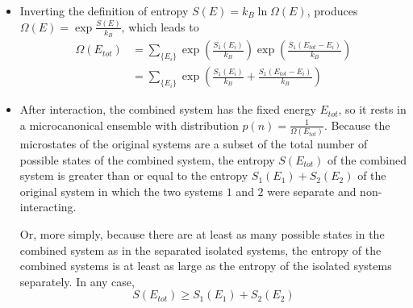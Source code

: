 \documentclass[11pt, a4paper]{article}
\begin{document}
\begin{itemize}
	\item Inverting the definition of entropy $ S(E) = k_{B}\ln \Omega(E) $, produces $ \Omega(E) = \exp \frac{S(E)}{k_{B}} $, which leads to 
	\begin{align*}
		\Omega(E_{tot}) &= \sum_{\{E_{i}\}} \exp(\frac{S_{1}(E_{i})}{k_{B}}) \exp(\frac{S_{1}(E_{tot} - E_{i})}{k_{B}}) \\
		& = \sum_{\{E_{i}\}} \exp(\frac{S_{1}(E_{i})}{k_{B}} + \frac{S_{1}(E_{tot} - E_{i})}{k_{B}})
	\end{align*}
	

	
	\item After interaction, the combined system has the fixed energy $ E_{tot} $, so it rests in a microcanonical ensemble with distribution $ p(n) = \frac{1}{\Omega(E_{tot})}$. Because the microstates of the original systems are a subset of the total number of possible states of the combined system, the entropy $ S(E_{tot}) $ of the combined system is greater than or equal to the entropy $ S_{1}(E_{1}) + S_{2}(E_{2}) $ of the original system in which the two systems $ 1 $ and $ 2 $ were separate and non-interacting.

	Or, more simply, because there are at least as many possible states in the combined system as in the separated isolated systems, the entropy of the combined systems is at least as large as the entropy of the isolated systems separately. In any case,
	\begin{equation*}
		S(E_{tot}) \geq S_{1}(E_{1}) + S_{2}(E_{2})
	\end{equation*}
	

\end{itemize}
\end{document}
